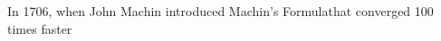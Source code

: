 \documentclass[preview]{standalone}
\begin{document}
\begin{center}
In 1706, when John Machin introduced Machin's Formulathat converged 100 times faster
\end{center}
\end{document}
